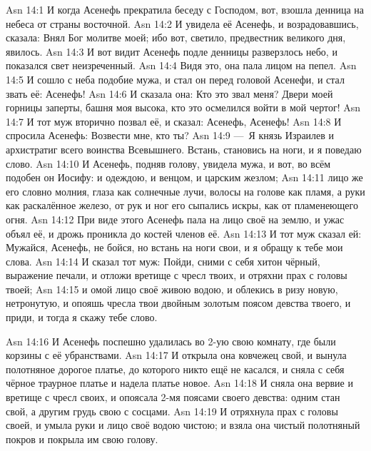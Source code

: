 \vs Asn 14:1
И когда Асенефь прекратила беседу с Господом,
вот, взошла денница на небеса от страны восточной.
\vs Asn 14:2
И увидела её Асенефь, и возрадовавшись, сказала:
Внял Бог молитве моей; ибо вот, светило,
предвестник великого дня, явилось.
\vs Asn 14:3
И вот видит Асенефь подле денницы разверзлось небо,
и показался свет неизреченный.
\vs Asn 14:4
Видя это, она пала лицом на пепел.
\vs Asn 14:5
И сошло с неба подобие мужа,
и стал он перед головой Асенефи, и стал звать её: Асенефь!
\vs Asn 14:6
И сказала она: Кто это звал меня?
Двери моей горницы заперты, башня моя высока,
кто это осмелился войти в мой чертог!
\vs Asn 14:7
И тот муж вторично позвал её, и сказал: Асенефь, Асенефь!
\vs Asn 14:8
И спросила Асенефь: Возвести мне, кто ты?
\vs Asn 14:9
---~Я князь Израилев и архистратиг
всего воинства Всевышнего.
Встань, становись на ноги, и я поведаю слово.
\vs Asn 14:10
И Асенефь, подняв голову, увидела мужа,
и вот, во всём подобен он Иосифу:
и одеждою, и венцом, и царским жезлом;
\vs Asn 14:11
лицо же его словно молния,
глаза как солнечные лучи,
волосы на голове как пламя,
а руки как раскалённое железо,
от рук и ног его сыпались искры,
как от пламенеющего огня.
\vs Asn 14:12
При виде этого Асенефь пала на лицо своё на землю,
и ужас объял её, и дрожь проникла до костей членов её.
\vs Asn 14:13
И тот муж сказал ей:
Мужайся, Асенефь, не бойся,
но встань на ноги свои, и я обращу к тебе мои слова.
\vs Asn 14:14
И сказал тот муж:
Пойди, сними с себя хитон чёрный,
выражение печали, и отложи вретище с чресл твоих,
и отряхни прах с головы твоей;
\vs Asn 14:15
и омой лицо своё живою водою,
и облекись в ризу новую, нетронутую,
и опояшь чресла твои двойным
золотым поясом девства твоего,
и приди, и тогда я скажу тебе слово.

\vs Asn 14:16
И Асенефь поспешно
удалилась во 2-ую свою комнату,
где были корзины с её убранствами.
\vs Asn 14:17
И открыла она ковчежец свой,
и вынула полотняное дорогое платье,
до которого никто ещё не касался,
и сняла с себя чёрное траурное платье
и надела платье новое.
\vs Asn 14:18
И сняла она вервие и вретище с чресл своих,
и опоясала 2-мя поясами своего девства:
одним стан свой, а другим грудь свою с сосцами.
\vs Asn 14:19
И отряхнула прах с головы своей,
и умыла руки и лицо своё водою чистою;
и взяла она чистый полотняный покров
и покрыла им свою голову.

